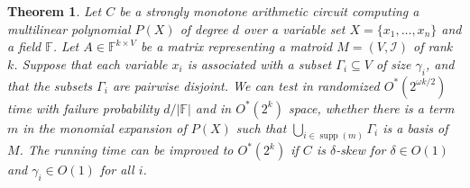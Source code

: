 \documentclass[10pt,a4paper]{article}
\newtheorem{theorem}{Theorem}[section]
\newcommand{\F}{\ensuremath{\mathbb F}\xspace}
\newcommand{\cI}{\ensuremath{\mathcal I}\xspace}
\DeclareMathOperator{\supp}{supp}
\begin{document}
\begin{theorem} \label{lemma:simple-matroid-sieving}
  Let $C$ be a strongly monotone arithmetic circuit computing a multilinear polynomial $P(X)$ of degree $d$ over a variable set $X=\{x_1,\ldots,x_n\}$ and a field $\F$.
  Let $A \in \F^{k \times V}$ be a matrix representing a matroid $M=(V, \cI)$ of rank~$k$. 
  Suppose that each variable $x_i$ is associated with a subset $\Gamma_i \subseteq V$ of size $\gamma_i$, and that the subsets $\Gamma_i$ are pairwise disjoint.
  We can test in randomized $O^*(2^{\omega k / 2})$ time with failure probability $d / |\F|$ and in $O^*(2^k)$ space, whether there is a term $m$ in the monomial expansion of $P(X)$ such that $\bigcup_{i \in \supp(m)} \Gamma_i$ is a basis of $M$.
  The running time can be improved to $O^*(2^{k})$ if $C$ is $\delta$-skew for $\delta \in O(1)$ and $\gamma_i \in O(1)$ for all $i$.
\end{theorem}
\end{document}
